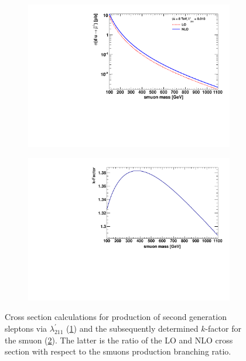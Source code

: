 \begin{figure}[!htb]
  \centering
  \begin{subfigure}[b]{0.495\textwidth}
    \centering
    \includegraphics[width=\textwidth]{plots/xs.pdf}
    \caption{\label{fig:xs}}
  \end{subfigure}
  \begin{subfigure}[b]{0.495\textwidth}
    \centering
    \includegraphics[width=\textwidth]{plots/k_smuon.pdf}
    \caption{\label{fig:k-smuon}}
  \end{subfigure}
  \caption{Cross section calculations for production of second generation sleptons via $\lambda^\prime_{211}$ (\ref{fig:xs}) and the subsequently determined $k$-factor for the smuon (\ref{fig:k-smuon}). The latter is the ratio of the LO and NLO cross section with respect to the smuons production branching ratio.}
  \label{fig:susys-xs-kfactor}
\end{figure}

